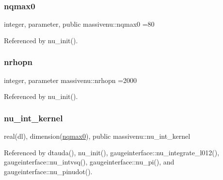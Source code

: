 \mbox{\label{namespacemassivenu_ae4e7d71c09007f613d462d593de26cca}} 
\subsubsection{\texorpdfstring{nqmax0}{nqmax0}}
{\footnotesize\ttfamily integer, parameter, public massivenu\+::nqmax0 =80}



Referenced by nu\+\_\+init().

\mbox{\label{namespacemassivenu_a25f2b3dce3fcea3371981c04a2ebd80c}} 
\subsubsection{\texorpdfstring{nrhopn}{nrhopn}}
{\footnotesize\ttfamily integer, parameter massivenu\+::nrhopn =2000\hspace{0.3cm}{\ttfamily [private]}}



Referenced by nu\+\_\+init().

\mbox{\label{namespacemassivenu_addf94ab5a9d895ca27a259f651853eb0}} 
\subsubsection{\texorpdfstring{nu\+\_\+int\+\_\+kernel}{nu\_int\_kernel}}
{\footnotesize\ttfamily real(dl), dimension(\mbox{\hyperlink{namespacemassivenu_ae4e7d71c09007f613d462d593de26cca}{nqmax0}}), public massivenu\+::nu\+\_\+int\+\_\+kernel}



Referenced by dtauda(), nu\+\_\+init(), gaugeinterface\+::nu\+\_\+integrate\+\_\+l012(), gaugeinterface\+::nu\+\_\+intvsq(), gaugeinterface\+::nu\+\_\+pi(), and gaugeinterface\+::nu\+\_\+pinudot().

\mbox{\label{namespacemassivenu_a12570e51825f5cec04f3e7d1fffa7702}} 
